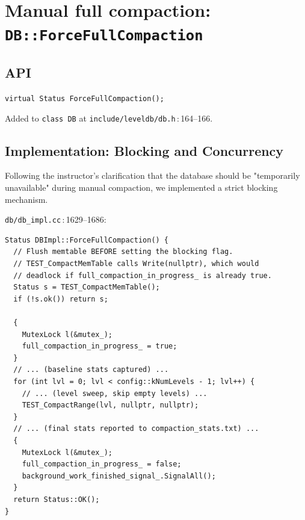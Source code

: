 \documentclass[11pt,a4paper]{article}
\newcommand{\codref}[2]{\textcolor{accent}{\texttt{\small#1}}\,$\!:\!$\textcolor{primary!70!black}{\small#2}}
\newcommand{\sym}[1]{\texttt{#1}}
\begin{document}
\newpage
\section{Manual full compaction: \texttt{DB::ForceFullCompaction}}\label{sec:fc}

\subsection{API}

\begin{spec}[Signature]
\sym{virtual Status ForceFullCompaction();}
\end{spec}

Added to \sym{class DB} at \codref{include/leveldb/db.h}{164--166}.

\subsection{Implementation: Blocking and Concurrency}

Following the instructor's clarification that the database should be "temporarily unavailable" during manual compaction, we implemented a strict blocking mechanism.

\codref{db/db\_impl.cc}{1629--1686}:

\begin{lstlisting}
Status DBImpl::ForceFullCompaction() {
  // Flush memtable BEFORE setting the blocking flag.
  // TEST_CompactMemTable calls Write(nullptr), which would
  // deadlock if full_compaction_in_progress_ is already true.
  Status s = TEST_CompactMemTable();
  if (!s.ok()) return s;

  {
    MutexLock l(&mutex_);
    full_compaction_in_progress_ = true;
  }
  // ... (baseline stats captured) ...
  for (int lvl = 0; lvl < config::kNumLevels - 1; lvl++) {
    // ... (level sweep, skip empty levels) ...
    TEST_CompactRange(lvl, nullptr, nullptr);
  }
  // ... (final stats reported to compaction_stats.txt) ...
  {
    MutexLock l(&mutex_);
    full_compaction_in_progress_ = false;
    background_work_finished_signal_.SignalAll();
  }
  return Status::OK();
}
\end{lstlisting}
\end{document}

